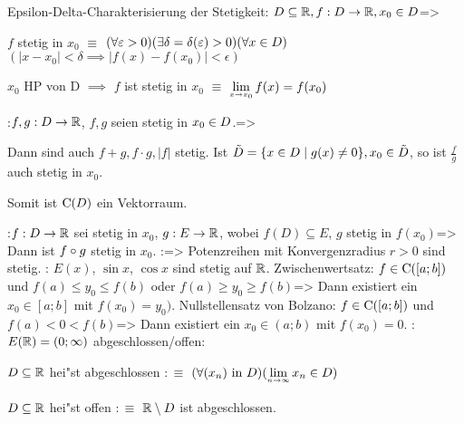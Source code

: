 \theorem Epsilon-Delta-Charakterisierung der Stetigkeit:
  $D\subseteq\mathbb R,f:D\to\mathbb R,x_0\in D$=>{
  \begin{stmts}
    \item $f$ stetig in $x_0$ $\equiv$
      $(\forall \varepsilon>0)(\exists \delta=\delta(\varepsilon)>0)(\forall x\in D)$ 
      $(|x-x_0|<\delta \implies |f(x)-f(x_0)|<\epsilon)$
    \item $x_0$ HP von D $\implies$ $f$ ist stetig in $x_0$ $\equiv$
      $\limx \xnull f(x)=f(x_0)$
    \end{stmts}
  }
\theorem:$f,g:D\to\mathbb R$, $f,g$ seien stetig in $x_0\in D$.=>{
  Dann sind auch $f+g,f\cdot g,|f|$ stetig.
  Ist $\tilde D=\{x\in D\mid g(x)\ne 0\}, x_0\in\tilde D$, so ist
  $\frac f g$ auch stetig in $x_0$.\par
  Somit ist ${\rm C}(D)$ ein Vektorraum.
  }
\theorem:$f:D\to\mathbb R$ sei stetig in $x_0$, $g: E\to\mathbb R$, wobei
  $f(D)\subseteq E$, $g$ stetig in $f(x_0)$=>{
  Dann ist $f\circ g$ stetig in $x_0$.
  }
\theorem:=>{
  Potenzreihen mit Konvergenzradius $r>0$ sind stetig.
  }
\remark:{
  $E(x)$, $\sin x$, $\cos x$ sind stetig auf $\mathbb R$.
  }
\theorem Zwischenwertsatz:
  $f\in {\rm C}([a;b])$ und $f(a)\le y_0\le f(b)$ oder $f(a)\ge y_0\ge f(b)$=>{
  Dann existiert ein $x_0\in [a;b]$ mit $f(x_0)=y_0)$.
  }
\theorem Nullstellensatz von Bolzano:
  $f\in {\rm C}([a;b])$ und $f(a)<0<f(b)$=>{
  Dann existiert ein $x_0\in (a;b)$ mit $f(x_0)=0$.
  }
\remark:{
  $E(\mathbb R)=(0;\infty)$
  }
 abgeschlossen/offen:{
  $D\subseteq\mathbb R$ hei"st abgeschlossen $:\equiv$
  $(\forall (x_n)\text{ in }D)(\limn x_n\defined)$
  
  $D\subseteq\mathbb R$ hei"st offen $:\equiv$
  $\mathbb R\setminus D$ ist abgeschlossen.
  }

